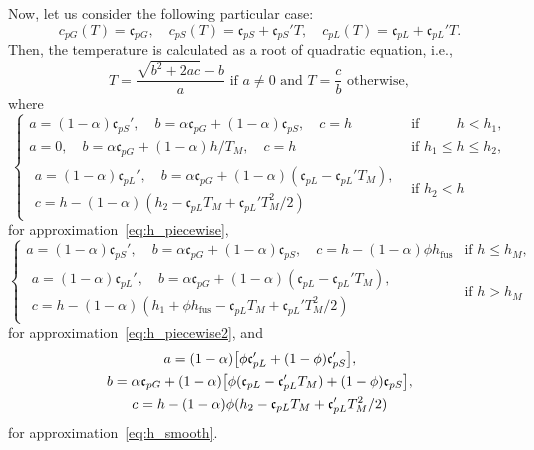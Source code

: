 \documentclass{article}
\newcommand{\fusion}[1]{{#1}_\mathrm{fus}}
\newcommand{\Cp}[1]{\mathfrak{c}_{p#1}}
\begin{document}
Now, let us consider the following particular case:
\begin{equation}\label{eq:c_p_special}
    c_{pG}(T) = \Cp{G}, \quad c_{pS}(T) = \Cp{S} + \Cp{S}'T, \quad c_{pL}(T) = \Cp{L} + \Cp{L}'T.
\end{equation}
Then, the temperature is calculated as a root of quadratic equation, i.e.,
\begin{equation}\label{eq:T_special}
    T = \frac{\sqrt{b^2 + 2ac} - b}{a} \text{ if } a\neq0 \text{ and }
    T = \frac{c}{b} \text{ otherwise},
\end{equation}
where
\begin{equation}\label{eq:abc1}
    \begin{cases}
        a=(1-\alpha)\Cp{S}', \quad b =\alpha\Cp{G} + (1-\alpha)\Cp{S}, \quad c=h
            &\text{if }\qquad\,\, h < h_1, \\
        a=0, \quad b=\alpha\Cp{G} + (1-\alpha)h/T_M, \quad c=h
            &\text{if } h_1 \leq h \leq h_2, \\
        \begin{gathered}
        a=(1-\alpha)\Cp{L}', \quad b=\alpha\Cp{G} + (1-\alpha)(\Cp{L}-\Cp{L}'T_M), \\
            c = h - (1-\alpha)(h_2 - \Cp{L}T_M + \Cp{L}'T_M^2/2)
        \end{gathered} &\text{if } h_2 < h
    \end{cases}
\end{equation}
for approximation~\eqref{eq:h_piecewise},
\begin{equation}\label{eq:abc2}
    \begin{cases}
        a=(1-\alpha)\Cp{S}', \quad b =\alpha\Cp{G} + (1-\alpha)\Cp{S}, \quad
            c=h - (1-\alpha)\phi\fusion{h} &\text{if } h \leq h_M, \\
        \begin{gathered}
        a=(1-\alpha)\Cp{L}', \quad b=\alpha\Cp{G} + (1-\alpha)(\Cp{L}-\Cp{L}'T_M), \\
            c = h - (1-\alpha)(h_1 + \phi\fusion{h} - \Cp{L}T_M + \Cp{L}'T_M^2/2)
        \end{gathered} &\text{if } h > h_M
    \end{cases}
\end{equation}
for approximation~\eqref{eq:h_piecewise2}, and
\begin{equation}\label{eq:abc3}
    \begin{gathered}
    a = (1-\alpha)\qty[ \phi\Cp{L}' + (1-\phi)\Cp{S}' ], \\
    b = \alpha\Cp{G} + (1-\alpha)\qty[ \phi(\Cp{L}-\Cp{L}'T_M) + (1-\phi)\Cp{S} ], \\
    c = h - (1-\alpha)\phi(h_2 - \Cp{L}T_M + \Cp{L}'T_M^2/2)
    \end{gathered}
\end{equation}
for approximation~\eqref{eq:h_smooth}.
\end{document}
